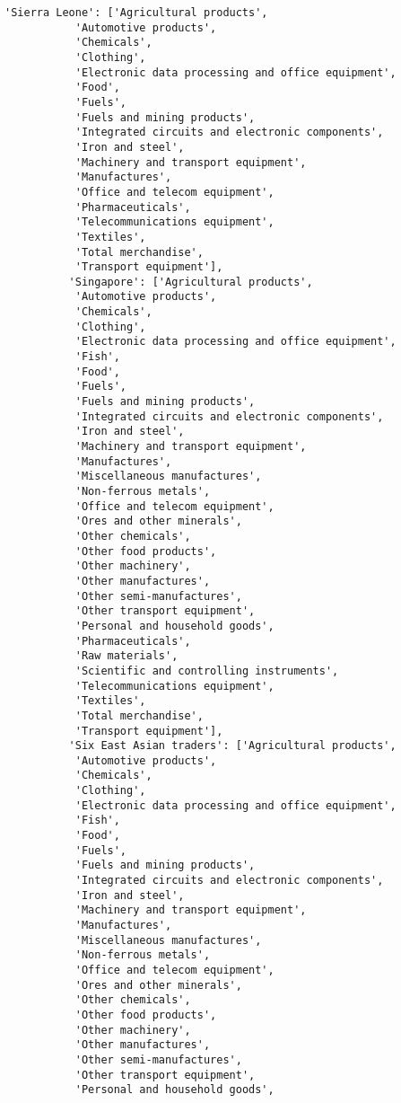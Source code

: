 \documentclass[11pt]{article}
\begin{document}
\begin{Verbatim}[commandchars=\\\{\}]
          'Sierra Leone': ['Agricultural products',
           'Automotive products',
           'Chemicals',
           'Clothing',
           'Electronic data processing and office equipment',
           'Food',
           'Fuels',
           'Fuels and mining products',
           'Integrated circuits and electronic components',
           'Iron and steel',
           'Machinery and transport equipment',
           'Manufactures',
           'Office and telecom equipment',
           'Pharmaceuticals',
           'Telecommunications equipment',
           'Textiles',
           'Total merchandise',
           'Transport equipment'],
          'Singapore': ['Agricultural products',
           'Automotive products',
           'Chemicals',
           'Clothing',
           'Electronic data processing and office equipment',
           'Fish',
           'Food',
           'Fuels',
           'Fuels and mining products',
           'Integrated circuits and electronic components',
           'Iron and steel',
           'Machinery and transport equipment',
           'Manufactures',
           'Miscellaneous manufactures',
           'Non-ferrous metals',
           'Office and telecom equipment',
           'Ores and other minerals',
           'Other chemicals',
           'Other food products',
           'Other machinery',
           'Other manufactures',
           'Other semi-manufactures',
           'Other transport equipment',
           'Personal and household goods',
           'Pharmaceuticals',
           'Raw materials',
           'Scientific and controlling instruments',
           'Telecommunications equipment',
           'Textiles',
           'Total merchandise',
           'Transport equipment'],
          'Six East Asian traders': ['Agricultural products',
           'Automotive products',
           'Chemicals',
           'Clothing',
           'Electronic data processing and office equipment',
           'Fish',
           'Food',
           'Fuels',
           'Fuels and mining products',
           'Integrated circuits and electronic components',
           'Iron and steel',
           'Machinery and transport equipment',
           'Manufactures',
           'Miscellaneous manufactures',
           'Non-ferrous metals',
           'Office and telecom equipment',
           'Ores and other minerals',
           'Other chemicals',
           'Other food products',
           'Other machinery',
           'Other manufactures',
           'Other semi-manufactures',
           'Other transport equipment',
           'Personal and household goods',

\end{Verbatim}
\end{document}
